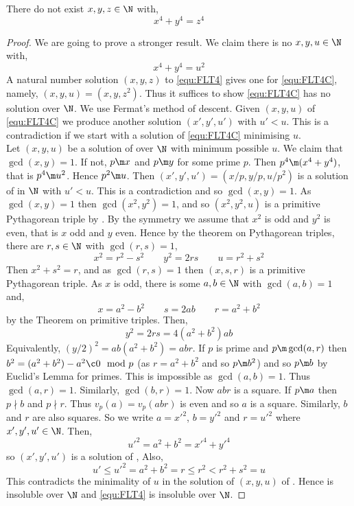 \begin{nthm}
  There do not exist $x, y, z \in \N$ with,
  \begin{equation}
    x^4 + y^4 = z^4\label{equ:FLT4}
  \end{equation}
\end{nthm}
\begin{proof}
  We are going to prove a stronger result. We claim there is no $x, y, u \in \N$ with,
  \begin{equation}
    x^4 + y^4 = u^2 \label{equ:FLT4C}
  \end{equation}
  A natural number solution $(x, y, z)$ to \ref{equ:FLT4} gives one for \ref{equ:FLT4C}, namely, $(x, y, u) = (x, y, z^2)$. Thus it suffices to show \ref{equ:FLT4C} has no solution over $\N$. We use Fermat's method of descent. Given $(x, y, u)$ of \ref{equ:FLT4C} we produce another solution $(x', y', u')$ with $u' < u$. This is a contradiction if we start with a solution of \ref{equ:FLT4C} minimising $u$.\\

  \noindent
  Let $(x, y, u)$ be a solution of  over $\N$ with minimum possible $u$. We claim that $\gcd(x, y) = 1$. If not, $p \m x$ and $p \m y$ for some prime $p$. Then $p^4 \m (x^4 + y^4)$, that is $p^4 \m u^2$. Hence $p^2 \m u$. Then $(x' ,y', u') = (x/p, y/p, u/p^2)$ is a solution of  in $\N$ with $u' < u$. This is a contradiction and so $\gcd(x, y) = 1$.
  As $\gcd(x, y) = 1$ then $\gcd(x^2, y^2) = 1$, and so $(x^2, y^2, u)$ is a primitive Pythagorean triple by . By the symmetry we assume that $x^2$ is odd and $y^2$ is even, that is $x$ odd and $y$ even. Hence by the theorem on Pythagorean triples, there are $r, s \in \N$ with $\gcd(r, s) = 1$,
  $$ x^2 = r^2 - s^2 \qquad y^2 = 2rs \qquad u = r^2 + s^2 $$
  Then $x^2 + s^2 = r$, and as $\gcd(r,s) = 1$ then $(x, s, r)$ is a primitive Pythagorean triple. As $x$ is odd, there is some $a, b \in \N$ with $\gcd(a, b) = 1$ and,
  $$ x = a^2 - b^2 \qquad s = 2ab \qquad r = a^2 + b^2 $$
  by the Theorem on primitive triples. Then,
  $$ y^2 = 2rs = 4(a^2 + b^2)ab $$
  Equivalently, $(y/2)^2 = ab(a^2 + b^2) = abr$. If $p$ is prime and $p \m \gcd(a, r)$ then $b^2 = (a^2 + b^2) - a^2 \c 0 \mod p$ (as $r = a^2 + b^2$ and so $p \m b^2$) and so $p \m b$ by Euclid's Lemma for primes. This is impossible as $\gcd(a, b) = 1$. Thus $\gcd(a, r) = 1$. Similarly, $\gcd(b, r) = 1$. Now $abr$ is a square. If $p \m a$
  then $p \nmid b$ and $p\nmid r$. Thus $v_p(a) = v_p(abr)$ is even and so $a$ is a square. Similarly, $b$ and $r$ are also squares. So we write $a = x'^2$, $b = y'^2$ and $r = u'^2$ where $x' ,y' , u' \in \N$. Then,
  $$ u'^2 = a^2 + b^2 = x'^4 + y'^4 $$
  so $(x', y' , u')$ is a solution of , Also,
  $$ u' \le u'^2 = a^2 + b^2 = r \le r^2 < r^2 + s^2 = u $$
  This contradicts the minimality of $u$ in the solution of $(x, y, u)$ of . Hence  is insoluble over $\N$ and \ref{equ:FLT4} is insoluble over $\N$.
\end{proof}

